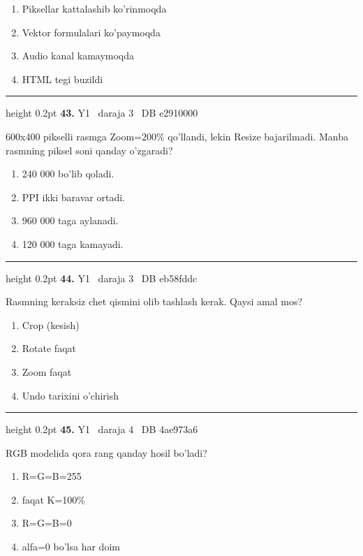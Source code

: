 \documentclass[10pt,a4paper,oneside]{article}
\begin{document}
\begin{enumerate}[label=\Alph*),leftmargin=9mm]
\item Piksellar kattalashib ko'rinmoqda
\item Vektor formulalari ko'paymoqda
\item Audio kanal kamaymoqda
\item HTML tegi buzildi
\end{enumerate}
\vspace{2mm}\hrule height 0.2pt \vspace{4mm}
\hypertarget{q43}{\textbf{\color{ink}43.}}  {\color{muted}\scriptsize Y1 \textbullet\ daraja 3 \textbullet\ DB e2910000}
\par
600x400 pikselli rasmga Zoom=200\% qo'llandi, lekin Resize bajarilmadi. Manba rasmning piksel soni qanday o'zgaradi?
\begin{enumerate}[label=\Alph*),leftmargin=9mm]
\item 240 000 bo'lib qoladi.
\item PPI ikki baravar ortadi.
\item 960 000 taga aylanadi.
\item 120 000 taga kamayadi.
\end{enumerate}
\vspace{2mm}\hrule height 0.2pt \vspace{4mm}
\hypertarget{q44}{\textbf{\color{ink}44.}}  {\color{muted}\scriptsize Y1 \textbullet\ daraja 3 \textbullet\ DB eb58fddc}
\par
Rasmning keraksiz chet qismini olib tashlash kerak. Qaysi amal mos?
\begin{enumerate}[label=\Alph*),leftmargin=9mm]
\item Crop (kesish)
\item Rotate faqat
\item Zoom faqat
\item Undo tarixini o'chirish
\end{enumerate}
\vspace{2mm}\hrule height 0.2pt \vspace{4mm}
\hypertarget{q45}{\textbf{\color{ink}45.}}  {\color{muted}\scriptsize Y1 \textbullet\ daraja 4 \textbullet\ DB 4ae973a6}
\par
RGB modelida qora rang qanday hosil bo'ladi?
\begin{enumerate}[label=\Alph*),leftmargin=9mm]
\item R=G=B=255
\item faqat K=100\%
\item R=G=B=0
\item alfa=0 bo'lsa har doim
\end{enumerate}
\end{document}
